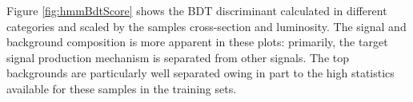 


Figure \ref{fig:hmmBdtScore} shows the BDT discriminant calculated in different categories and scaled by the samples cross-section and luminosity.
The signal and background composition is more apparent in these plots: primarily, the target signal production mechanism is separated from other signals.
The top backgrounds are particularly well separated owing in part to the high statistics available for these samples in the training sets.

 
